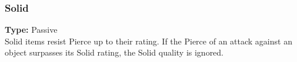 \subsubsection{Solid}
\label{iqty:solid}
\textbf{Type:} Passive\\
Solid items resist Pierce up to their rating. If the
Pierce of an attack against an object surpasses its Solid
rating, the Solid quality is ignored.

